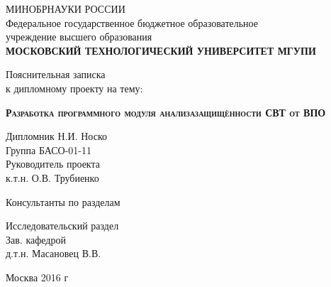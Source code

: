 \begin{titlepage}
\begin{center}
МИНОБРНАУКИ РОССИИ \\
Федеральное государственное бюджетное образовательное\\ учреждение высшего образования\\
\textbf{МОСКОВСКИЙ ТЕХНОЛОГИЧЕСКИЙ УНИВЕРСИТЕТ \linebreak МГУПИ\linebreak}
\end{center}
\vspace{3em}

\begin{center}
\Large Пояснительная записка \\ к дипломному проекту на тему:
\end{center}
\vspace{2.5em}
\begin{center}
\textsc{\textbf{Разработка программного модуля анализа\linebreak защищённости СВТ от ВПО}}
\end{center}
\vspace{1em}

\begin{flushleft}
Дипломник \hrulefill Н.И. Носко \\
Группа \hrulefill БАСО-01-11\\
\vspace{1em}
Руководитель проекта\\
к.т.н. \hrulefill О.В. Трубиенко\\
\begin {center}
Консультанты по разделам
\end {center}
Исследовательский раздел\\ 
\vspace{1em}
Зав. кафедрой \\
д.т.н. \hrulefill Масановец В.В.
\end{flushleft}
\vspace{\fill}

\begin{center}
Москва 2016 г
\end{center}
\end{titlepage}
